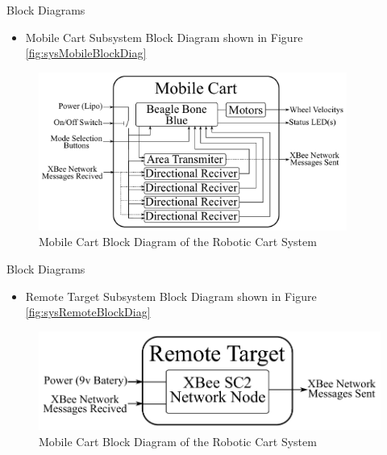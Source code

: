 \documentclass{beamer}
\begin{document}

\begin{frame}{Block Diagrams}
    \begin{itemize}
        \item Mobile Cart Subsystem Block Diagram shown in Figure \autoref{fig:sysMobileBlockDiag}
    \end{itemize}
    \begin{figure}[b]
        \centering
        \includegraphics[width=0.9\textwidth]{figs/mobile_cart_block_diagram}
        \caption{Mobile Cart Block Diagram of the Robotic Cart System}
        \label{fig:sysMobileBlockDiag}
    \end{figure}
\end{frame}


\begin{frame}{Block Diagrams}
    \begin{itemize}
        \item Remote Target Subsystem Block Diagram shown in Figure \autoref{fig:sysRemoteBlockDiag}
    \end{itemize}
    \begin{figure}[b]
        \centering
        \includegraphics[width=\textwidth]{figs/remote_target_block_diagram}
        \caption{Mobile Cart Block Diagram of the Robotic Cart System}
        \label{fig:sysRemoteBlockDiag}
    \end{figure}
\end{frame}
\end{document}
